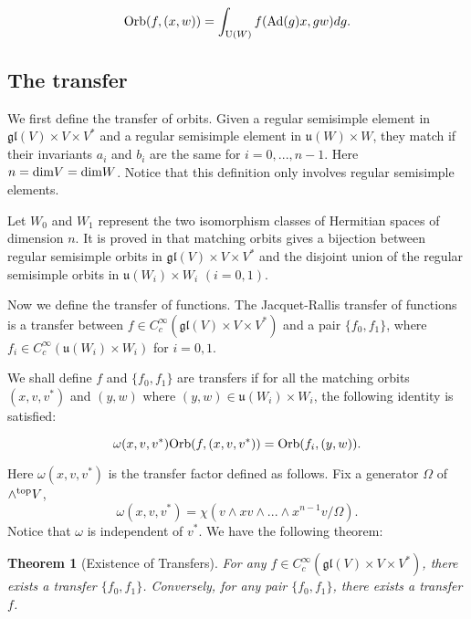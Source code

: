 \documentclass[11pt, oneside,reqno]{amsart}   	%
\newtheorem{theorem}{Theorem}[section]
\begin{document}
$$\textup{Orb}(f,(x,w))=\int_{\textup{U}(W)}f(\textup{Ad}(g)x,gw)dg.$$

\subsection{The transfer} \label{the transfer}

We first define the transfer of orbits. Given a regular semisimple element in $\mathfrak{gl}(V)\times V\times V^*$ and a regular semisimple element in $\mathfrak{u}(W)\times W$, they match if their invariants $a_i$ and $b_i$ are the same for $i=0,...,n-1$. Here $n=\textup{dim}V=\textup{dim}W$. Notice that this definition only involves regular semisimple elements. 

Let $W_0$ and $W_1$ represent the two isomorphism classes of Hermitian spaces of dimension $n$. It is proved in \cite{Wei3} that matching orbits gives a bijection between regular semisimple orbits in $\mathfrak{gl}(V)\times V\times V^*$ and the disjoint union of the regular semisimple orbits in $\mathfrak{u}(W_i)\times W_i$ $(i=0,1)$.

Now we define the transfer of functions. The Jacquet-Rallis transfer of functions is a transfer between $f \in C_c^\infty(\mathfrak{gl}(V)\times V\times V^*)$ and a pair $\{f_0,f_1\}$, where $f_i \in C_c^\infty(\mathfrak{u}(W_i)\times W_i)$ for  $i=0,1$.

We shall define $f$ and $\{f_0,f_1\}$ are transfers if for all the matching orbits $(x,v,v^*)$ and $(y,w)$ where $(y,w) \in \mathfrak{u}(W_i) \times W_i$, the following identity is satisfied:

$$\omega(x,v,v^*)\textup{Orb}(f,(x,v,v^*))=\textup{Orb}(f_i,(y,w)).$$

Here $\omega(x,v,v^*)$ is the transfer factor defined as follows. Fix a generator $\Omega$ of $\wedge^{\textup{top}}V$, 
\begin{equation}  \label{transfer}
\omega(x, v, v^*) = \chi(v\wedge x v \wedge ... \wedge x^{n-1}v/\Omega).
\end{equation}
Notice that $\omega$ is independent of $v^*$. We have the following theorem:

\begin{theorem}[Existence of Transfers] \label{JR exist}
For any $f \in C_c^\infty(\mathfrak{gl}(V)\times V\times V^*)$, there exists a transfer $\{f_0,f_1\}$. Conversely, for any pair $\{f_0,f_1\}$, there exists a transfer $f$.

\end{theorem}
\end{document}
